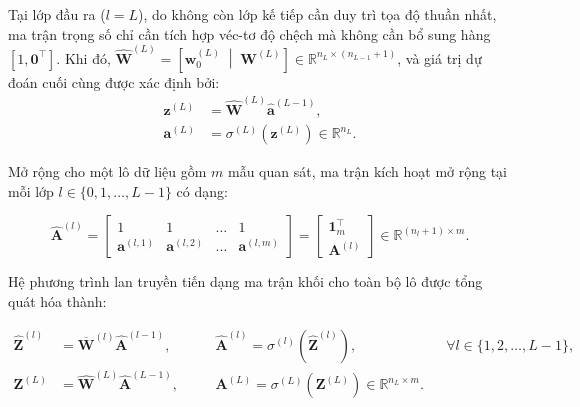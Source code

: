 Tại lớp đầu ra ($l = L$), do không còn lớp kế tiếp cần duy trì tọa độ thuần nhất, ma trận trọng số chỉ cần tích hợp véc-tơ độ chệch mà không cần bổ sung hàng $[1, \mathbf{0}^\top]$. Khi đó, $\hat{\mathbf{W}}^{(L)} = \left[\mathbf{w}_0^{(L)} \;\middle|\; \mathbf{W}^{(L)}\right] \in \mathbb{R}^{n_L \times (n_{L-1} + 1)}$, và giá trị dự đoán cuối cùng được xác định bởi:
\begin{align}
    \mathbf{z}^{(L)} &= \hat{\mathbf{W}}^{(L)} \hat{\mathbf{a}}^{(L-1)}, \\
    \mathbf{a}^{(L)} &= \sigma^{(L)}\left(\mathbf{z}^{(L)}\right) \in \mathbb{R}^{n_L}.
\end{align}

Mở rộng cho một lô dữ liệu gồm $m$ mẫu quan sát, ma trận kích hoạt mở rộng tại mỗi lớp $l \in \{0, 1, \dots, L-1\}$ có dạng:

\begin{equation}
    \hat{\mathbf{A}}^{(l)} = \begin{bmatrix}
        1 & 1 & \dots & 1 \\
        \mathbf{a}^{(l, 1)} & \mathbf{a}^{(l, 2)} & \dots & \mathbf{a}^{(l, m)}
    \end{bmatrix} = \begin{bmatrix} \mathbf{1}_m^\top \\ \mathbf{A}^{(l)} \end{bmatrix} \in \mathbb{R}^{(n_l + 1) \times m}.
\end{equation}

Hệ phương trình lan truyền tiến dạng ma trận khối cho toàn bộ lô được tổng quát hóa thành:

\begin{align}
    \hat{\mathbf{Z}}^{(l)} &= \overline{\mathbf{W}}^{(l)} \hat{\mathbf{A}}^{(l-1)}, \quad &&\hat{\mathbf{A}}^{(l)} = \sigma^{(l)}\left(\hat{\mathbf{Z}}^{(l)}\right), \quad &&\forall l \in \{1, 2, \dots, L-1\}, \\
    \mathbf{Z}^{(L)} &= \hat{\mathbf{W}}^{(L)} \hat{\mathbf{A}}^{(L-1)}, \quad &&\mathbf{A}^{(L)} = \sigma^{(L)}\left(\mathbf{Z}^{(L)}\right) \in \mathbb{R}^{n_L \times m}.
\end{align}


